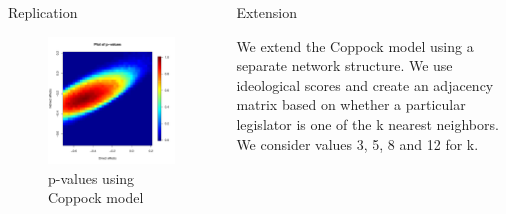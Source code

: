\documentclass[final]{beamer}
\newlength{\onecolwid}
\newlength{\onecolwidd}
\begin{document}
\begin{frame}[t]
\begin{columns}[t]
\begin{column}{\onecolwidd}
\begin{block}{Replication}
\begin{rmfamily}
	\begin{figure}

	\centering
	\includegraphics[scale=1]{pvalues_figure.pdf}
	\caption{p-values using Coppock model}
	\end{figure}

	\end{rmfamily}						
	\end{block}
	\end{column}


\begin{column}{\onecolwidd}
\begin{block}{Extension}
	\begin{rmfamily}
	
	We extend the Coppock model using a separate network structure. We use ideological scores and create an adjacency matrix based on whether a particular legislator is one of the k nearest neighbors. We consider values 3, 5, 8 and 12 for k.
	

\end{rmfamily}
\end{block}
\end{column}
\end{columns}
\end{frame}
\end{document}
